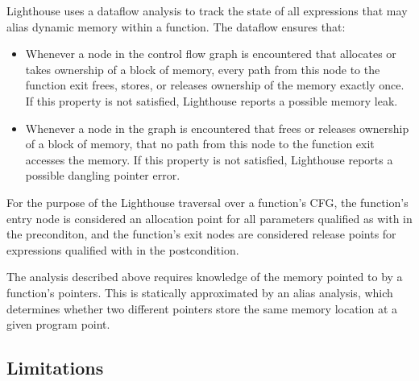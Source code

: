 Lighthouse uses a dataflow analysis to track the state of all expressions that
may alias dynamic memory within a function.
%
The dataflow ensures that:
%
\begin{itemize}
%
\item Whenever a node in the control flow graph is encountered that allocates
or takes ownership of a block of memory, every path from this node to the
function exit frees, stores, or releases ownership of the memory exactly once.  
%
If this property is not satisfied, Lighthouse reports a possible memory leak.
%
\item Whenever a node in the graph is encountered that frees or releases
ownership of a block of memory, that no path from this node to the function
exit accesses the memory.  
%
If this property is not satisfied, Lighthouse reports a possible dangling
pointer error.
%
\end{itemize}
%
For the purpose of the Lighthouse traversal over a function's CFG, the
function's entry node is considered an allocation point for all
parameters qualified as with  in the preconditon, and the function's exit
nodes are considered release points for expressions qualified with
 in the postcondition.



The analysis described above requires knowledge of the memory pointed to by
a function's pointers.  
%
This is statically approximated by an alias analysis, which determines
whether two different pointers store the same memory location at a given
program point.  



\subsection{Limitations}



